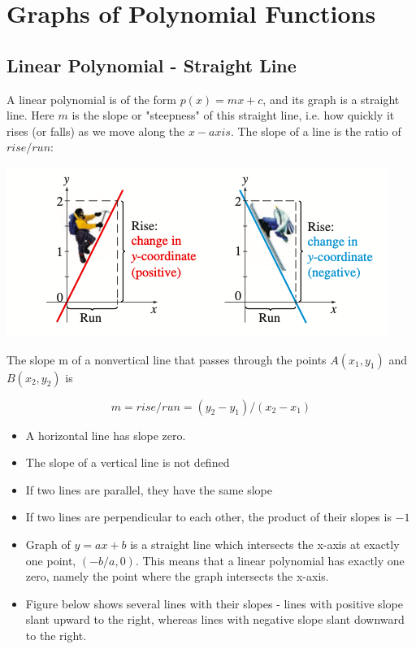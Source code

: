 \documentclass{book}
\begin{document}
	\chapter{Graphs of Polynomial Functions}
	
	\section{Linear Polynomial - Straight Line}
	A linear polynomial is of the form $p(x) = mx + c$, and its graph is a straight line. Here $m$ is the slope or "steepness" of this straight line, i.e. how quickly it rises (or falls) as we move along the $x-axis$. The slope of a line is the ratio of $rise/run$:
	
	\includegraphics[scale=0.7]{slope1}

	The slope m of a nonvertical line that passes through the points $A(x_1,y_1)$ and $B(x_2,y_2)$ is
	
	$$m = rise/run = (y_2-y_1)/(x_2-x_1)$$
	
	\begin{itemize}
		\item A horizontal line has slope zero.
		\item The slope of a vertical line is not defined
		\item If two lines are parallel, they have the same slope
		\item If two lines are perpendicular to each other, the product of their slopes is $-1$
		\item Graph of $y = ax + b$ is a straight line which intersects the x-axis at exactly one point, $(-b/a,0)$. This means that a linear polynomial has exactly one zero, namely the point where the graph intersects the x-axis.
		\item Figure below shows several lines with their slopes - lines with positive slope slant upward to the right, whereas lines with negative slope slant downward to the right.
	\end{itemize}
	
\end{document}
